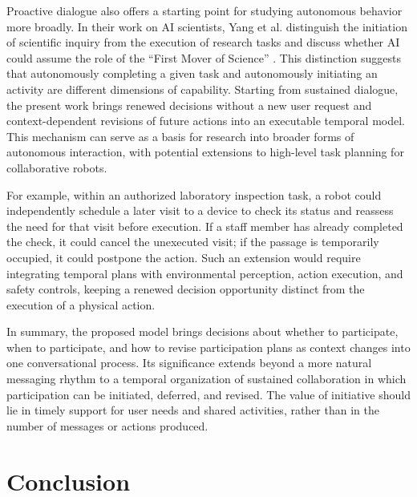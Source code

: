 \documentclass[manuscript,nonacm]{acmart}
\begin{document}
Proactive dialogue also offers a starting point for studying autonomous behavior
more broadly. In their work on AI scientists, Yang et al. distinguish the
initiation of scientific inquiry from the execution of research tasks and
discuss whether AI could assume the role of the ``First Mover of Science''
\cite{yang2023ai}. This distinction suggests that autonomously completing a
given task and autonomously initiating an activity are different dimensions of
capability. Starting from sustained dialogue, the present work brings renewed
decisions without a new user request and context-dependent revisions of future
actions into an executable temporal model. This mechanism can serve as a basis
for research into broader forms of autonomous interaction, with potential
extensions to high-level task planning for collaborative robots.

For example, within an authorized laboratory inspection task, a robot could
independently schedule a later visit to a device to check its status and
reassess the need for that visit before execution. If a staff member has already
completed the check, it could cancel the unexecuted visit; if the passage is
temporarily occupied, it could postpone the action. Such an extension would
require integrating temporal plans with environmental perception, action
execution, and safety controls, keeping a renewed decision opportunity distinct
from the execution of a physical action.

In summary, the proposed model brings decisions about whether to participate,
when to participate, and how to revise participation plans as context changes
into one conversational process. Its significance extends beyond a more natural
messaging rhythm to a temporal organization of sustained collaboration in which
participation can be initiated, deferred, and revised. The value of initiative
should lie in timely support for user needs and shared activities, rather than
in the number of messages or actions produced.

\section{Conclusion}
\end{document}
